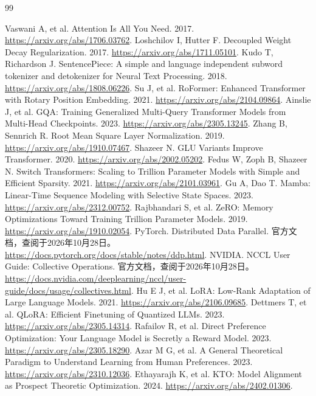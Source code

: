 \documentclass[UTF8,12pt,a4paper,fontset=fandol]{ctexbook}
\begin{document}


\backmatter
\begin{thebibliography}{99}

 Vaswani A, et al. Attention Is All You Need. 2017. \url{https://arxiv.org/abs/1706.03762}.
 Loshchilov I, Hutter F. Decoupled Weight Decay Regularization. 2017. \url{https://arxiv.org/abs/1711.05101}.
 Kudo T, Richardson J. SentencePiece: A simple and language independent subword tokenizer and detokenizer for Neural Text Processing. 2018. \url{https://arxiv.org/abs/1808.06226}.
 Su J, et al. RoFormer: Enhanced Transformer with Rotary Position Embedding. 2021. \url{https://arxiv.org/abs/2104.09864}.
 Ainslie J, et al. GQA: Training Generalized Multi-Query Transformer Models from Multi-Head Checkpoints. 2023. \url{https://arxiv.org/abs/2305.13245}.
 Zhang B, Sennrich R. Root Mean Square Layer Normalization. 2019. \url{https://arxiv.org/abs/1910.07467}.
 Shazeer N. GLU Variants Improve Transformer. 2020. \url{https://arxiv.org/abs/2002.05202}.
 Fedus W, Zoph B, Shazeer N. Switch Transformers: Scaling to Trillion Parameter Models with Simple and Efficient Sparsity. 2021. \url{https://arxiv.org/abs/2101.03961}.
 Gu A, Dao T. Mamba: Linear-Time Sequence Modeling with Selective State Spaces. 2023. \url{https://arxiv.org/abs/2312.00752}.
 Rajbhandari S, et al. ZeRO: Memory Optimizations Toward Training Trillion Parameter Models. 2019. \url{https://arxiv.org/abs/1910.02054}.
 PyTorch. Distributed Data Parallel. 官方文档，查阅于2026年10月28日。\url{https://docs.pytorch.org/docs/stable/notes/ddp.html}.
 NVIDIA. NCCL User Guide: Collective Operations. 官方文档，查阅于2026年10月28日。\url{https://docs.nvidia.com/deeplearning/nccl/user-guide/docs/usage/collectives.html}.
 Hu E J, et al. LoRA: Low-Rank Adaptation of Large Language Models. 2021. \url{https://arxiv.org/abs/2106.09685}.
 Dettmers T, et al. QLoRA: Efficient Finetuning of Quantized LLMs. 2023. \url{https://arxiv.org/abs/2305.14314}.
 Rafailov R, et al. Direct Preference Optimization: Your Language Model is Secretly a Reward Model. 2023. \url{https://arxiv.org/abs/2305.18290}.
 Azar M G, et al. A General Theoretical Paradigm to Understand Learning from Human Preferences. 2023. \url{https://arxiv.org/abs/2310.12036}.
 Ethayarajh K, et al. KTO: Model Alignment as Prospect Theoretic Optimization. 2024. \url{https://arxiv.org/abs/2402.01306}.

\end{thebibliography}
\end{document}
